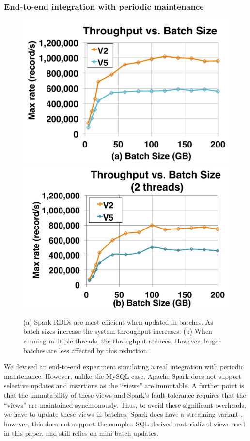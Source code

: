 \subsubsection{End-to-end integration with periodic maintenance}
\begin{figure}[t]
\centering
 \includegraphics[scale=0.13]{exp/con_1.pdf}
 \includegraphics[scale=0.13]{exp/con_2.pdf}\vspace{-1em}
 \caption{(a) Spark RDDs are most efficient when updated in batches. As batch sizes increase the system throughput increases. (b) When running multiple threads, the throughput reduces. However, larger batches are less affected by this reduction. \label{conv-2}}\vspace{-1.25em}
\end{figure}

We devised an end-to-end experiment simulating a real integration with periodic maintenance.
However, unlike the MySQL case, Apache Spark does not support selective updates and insertions as the ``views'' are immutable.
A further point is that the immutability of these views and Spark's fault-tolerance requires that the ``views'' are maintained synchronously.
Thus, to avoid these significant overheads, we have to update these views in batches.
Spark does have a streaming variant \cite{zaharia2012discretized}, however, this does not support the complex SQL derived materialized views used in this paper, and still relies on mini-batch updates.

